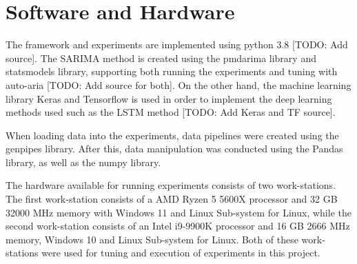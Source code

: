 
\section{Software and Hardware}
\label{section:Method:Hardware&Software}


The framework and experiments are implemented using python 3.8 [TODO: Add source].
The SARIMA method is created using the pmdarima library and statsmodels library,
supporting both running the experiments and tuning with auto-aria [TODO: Add source for both].
On the other hand, the machine learning library Keras and Tensorflow is used in order to implement the deep learning methods used such as the LSTM method [TODO: Add Keras and TF source].

When loading data into the experiments, data pipelines were created using the genpipes library.
After this, data manipulation was conducted using the Pandas library, as well as the numpy library.


The hardware available for running experiments consists of two work-stations.
The first work-station consists of a AMD Ryzen 5 5600X processor and 32 GB 32000 MHz memory with Windows 11 and Linux Sub-system for Linux,
while the second work-station consists of an Intel i9-9900K processor and 16 GB 2666 MHz memory, Windows 10 and Linux Sub-system for Linux.
Both of these work-stations were used for tuning and execution of experiments in this project.


